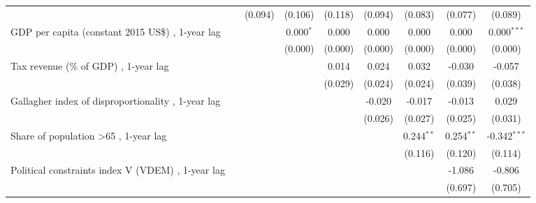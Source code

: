 \begin{table}[htbp]
\begin{tabular}{lcccccccc}
                                                                                 &                & (0.094)        & (0.106)        & (0.118)        & (0.094)        & (0.083)        & (0.077)       & (0.089)\\   
      GDP per capita (constant 2015 US\$) , 1-year lag                           &                &                & 0.000$^{*}$    & 0.000          & 0.000          & 0.000          & 0.000         & 0.000$^{***}$\\   
                                                                                 &                &                & (0.000)        & (0.000)        & (0.000)        & (0.000)        & (0.000)       & (0.000)\\   
      Tax revenue (\% of GDP) , 1-year lag                                       &                &                &                & 0.014          & 0.024          & 0.032          & -0.030        & -0.057\\   
                                                                                 &                &                &                & (0.029)        & (0.024)        & (0.024)        & (0.039)       & (0.038)\\   
      Gallagher index of disproportionality , 1-year lag                         &                &                &                &                & -0.020         & -0.017         & -0.013        & 0.029\\   
                                                                                 &                &                &                &                & (0.026)        & (0.027)        & (0.025)       & (0.031)\\   
      Share of population >65 , 1-year lag                                       &                &                &                &                &                & 0.244$^{**}$   & 0.254$^{**}$  & -0.342$^{***}$\\   
                                                                                 &                &                &                &                &                & (0.116)        & (0.120)       & (0.114)\\   
      Political constraints index V (VDEM) , 1-year lag                          &                &                &                &                &                &                & -1.086        & -0.806\\   
                                                                                 &                &                &                &                &                &                & (0.697)       & (0.705)\\   

\end{tabular}
\end{table}
